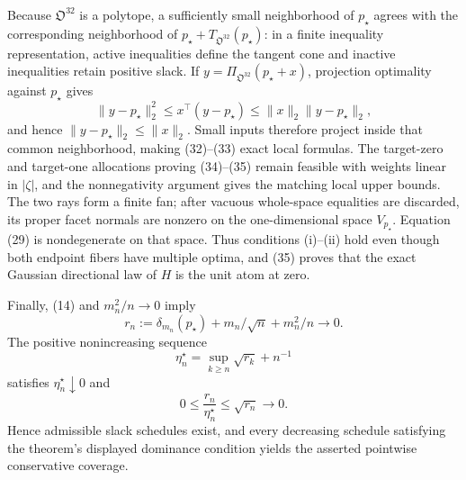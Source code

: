 Because \(\mathfrak O^{32}\) is a polytope, a sufficiently small neighborhood of \(p_\star\) agrees with the corresponding neighborhood of \(p_\star+T_{\mathfrak O^{32}}(p_\star)\): in a finite inequality representation, active inequalities define the tangent cone and inactive inequalities retain positive slack.  If \(y=\Pi_{\mathfrak O^{32}}(p_\star+x)\), projection optimality against \(p_\star\) gives
\[
\|y-p_\star\|_2^2\leq x^{\top}(y-p_\star)
\leq\|x\|_2\|y-p_\star\|_2,
\]
and hence \(\|y-p_\star\|_2\leq\|x\|_2\).  Small inputs therefore project inside that common neighborhood, making (32)--(33) exact local formulas.  The target-zero and target-one allocations proving (34)--(35) remain feasible with weights linear in \(|\zeta|\), and the nonnegativity argument gives the matching local upper bounds.  The two rays form a finite fan; after vacuous whole-space equalities are discarded, its proper facet normals are nonzero on the one-dimensional space \(V_{p_\star}\).  Equation (29) is nondegenerate on that space.  Thus conditions (i)--(ii) hold even though both endpoint fibers have multiple optima, and (35) proves that the exact Gaussian directional law of \(H\) is the unit atom at zero.

Finally, (14) and \(m_n^2/n\to0\) imply
\[
r_n:=\delta_{m_n}(p_\star)+m_n/\sqrt n+m_n^2/n\longrightarrow0.
\]
The positive nonincreasing sequence
\[
\eta_n^\star=\sup_{k\geq n}\sqrt{r_k}+n^{-1}
\]
satisfies \(\eta_n^\star\downarrow0\) and
\[
0\leq\frac{r_n}{\eta_n^\star}\leq\sqrt{r_n}\longrightarrow0.
\]
Hence admissible slack schedules exist, and every decreasing schedule satisfying the theorem's displayed dominance condition yields the asserted pointwise conservative coverage.